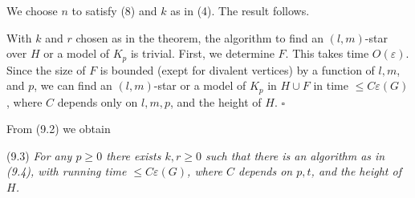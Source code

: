 We choose $n$ to satisfy (8) and $k$ as in (4). The result follows.

With $k$ and $r$ chosen as in the theorem, the algorithm to find an $(l, m)$-star over $H$ or a model of $K_p$ is trivial. First, we determine $F$. This takes time $O(\varepsilon)$. Since the size of $F$ is bounded (exept for divalent vertices) by a function of $l, m$, and $p$, we can find an $(l, m)$-star or a model of $K_p$ in $H \cup F$ in time $\le C\varepsilon(G)$, where $C$ depends only on $l, m, p$, and the height of $H$. $\square$

From (9.2) we obtain

\stmt
(9.3) \textit{For any $p \ge 0$ there exists $k, r \ge 0$ such that there is an algorithm as in (9.4), with running time $\le C\varepsilon(G)$, where $C$ depends on $p, t$, and the height of $H$.}
